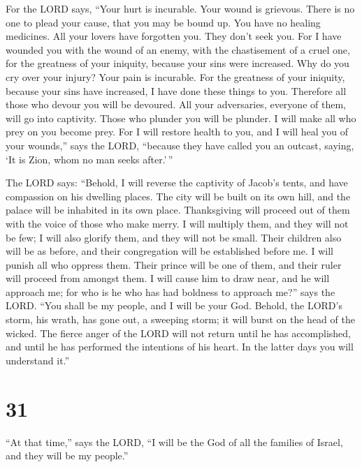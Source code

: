  For the LORD says, ``Your hurt is incurable. Your wound
is grievous.  There is no one to plead your cause, that
you may be bound up. You have no healing medicines.  All
your lovers have forgotten you. They don't seek you. For I have wounded
you with the wound of an enemy, with the chastisement of a cruel one,
for the greatness of your iniquity, because your sins were increased.
 Why do you cry over your injury? Your pain is incurable.
For the greatness of your iniquity, because your sins have increased, I
have done these things to you.  Therefore all those who
devour you will be devoured. All your adversaries, everyone of them,
will go into captivity. Those who plunder you will be plunder. I will
make all who prey on you become prey.  For I will restore
health to you, and I will heal you of your wounds,'' says the LORD,
``because they have called you an outcast, saying, `It is Zion, whom no
man seeks after.'\,''

 The LORD says: ``Behold, I will reverse the captivity of
Jacob's tents, and have compassion on his dwelling places. The city will
be built on its own hill, and the palace will be inhabited in its own
place.  Thanksgiving will proceed out of them with the
voice of those who make merry. I will multiply them, and they will not
be few; I will also glorify them, and they will not be small.
 Their children also will be as before, and their
congregation will be established before me. I will punish all who
oppress them.  Their prince will be one of them, and
their ruler will proceed from amongst them. I will cause him to draw
near, and he will approach me; for who is he who has had boldness to
approach me?'' says the LORD.  ``You shall be my people,
and I will be your God.  Behold, the LORD's storm, his
wrath, has gone out, a sweeping storm; it will burst on the head of the
wicked.  The fierce anger of the LORD will not return
until he has accomplished, and until he has performed the intentions of
his heart. In the latter days you will understand it.''

\hypertarget{section-30}{%
\section{31}\label{section-30}}

 ``At that time,'' says the LORD, ``I will be the God of
all the families of Israel, and they will be my people.''

